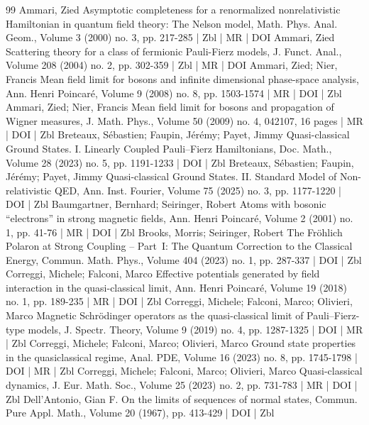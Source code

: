 \documentclass[10pt]{amsart}
\theoremstyle{definition}\newtheorem{defi}[theo]{Definition}\newtheorem{rema}[theo]{Remark}\newtheorem{exam}[theo]{Example}\newtheorem{exem}[theo]{Example}\newtheorem{nota}[theo]{Notation}
\newcommand{\1}{\mathds{1}}
\begin{document}
\begin{thebibliography}{99}
 Ammari, Zied Asymptotic completeness for a renormalized nonrelativistic Hamiltonian in quantum field theory: The Nelson model, Math. Phys. Anal. Geom., Volume 3 (2000) no. 3, pp. 217-285 | Zbl | MR | DOI
 Ammari, Zied Scattering theory for a class of fermionic Pauli-Fierz models, J. Funct. Anal., Volume 208 (2004) no. 2, pp. 302-359 | Zbl | MR | DOI
 Ammari, Zied; Nier, Francis Mean field limit for bosons and infinite dimensional phase-space analysis, Ann. Henri Poincaré, Volume 9 (2008) no. 8, pp. 1503-1574 | MR | DOI | Zbl
 Ammari, Zied; Nier, Francis Mean field limit for bosons and propagation of Wigner measures, J. Math. Phys., Volume 50 (2009) no. 4, 042107, 16 pages | MR | DOI | Zbl
 Breteaux, Sébastien; Faupin, Jérémy; Payet, Jimmy Quasi-classical Ground States. I. Linearly Coupled Pauli–Fierz Hamiltonians, Doc. Math., Volume 28 (2023) no. 5, pp. 1191-1233 | DOI | Zbl
 Breteaux, Sébastien; Faupin, Jérémy; Payet, Jimmy Quasi-classical Ground States. II. Standard Model of Non-relativistic QED, Ann. Inst. Fourier, Volume 75 (2025) no. 3, pp. 1177-1220 | DOI | Zbl
 Baumgartner, Bernhard; Seiringer, Robert Atoms with bosonic “electrons” in strong magnetic fields, Ann. Henri Poincaré, Volume 2 (2001) no. 1, pp. 41-76 | MR | DOI | Zbl
 Brooks, Morris; Seiringer, Robert The Fröhlich Polaron at Strong Coupling – Part I: The Quantum Correction to the Classical Energy, Commun. Math. Phys., Volume 404 (2023) no. 1, pp. 287-337 | DOI | Zbl
 Correggi, Michele; Falconi, Marco Effective potentials generated by field interaction in the quasi-classical limit, Ann. Henri Poincaré, Volume 19 (2018) no. 1, pp. 189-235 | MR | DOI | Zbl
 Correggi, Michele; Falconi, Marco; Olivieri, Marco Magnetic Schrödinger operators as the quasi-classical limit of Pauli–Fierz-type models, J. Spectr. Theory, Volume 9 (2019) no. 4, pp. 1287-1325 | DOI | MR | Zbl
 Correggi, Michele; Falconi, Marco; Olivieri, Marco Ground state properties in the quasiclassical regime, Anal. PDE, Volume 16 (2023) no. 8, pp. 1745-1798 | DOI | MR | Zbl
 Correggi, Michele; Falconi, Marco; Olivieri, Marco Quasi-classical dynamics, J. Eur. Math. Soc., Volume 25 (2023) no. 2, pp. 731-783 | MR | DOI | Zbl
 Dell’Antonio, Gian F. On the limits of sequences of normal states, Commun. Pure Appl. Math., Volume 20 (1967), pp. 413-429 | DOI | Zbl

\end{thebibliography}
\end{document}
